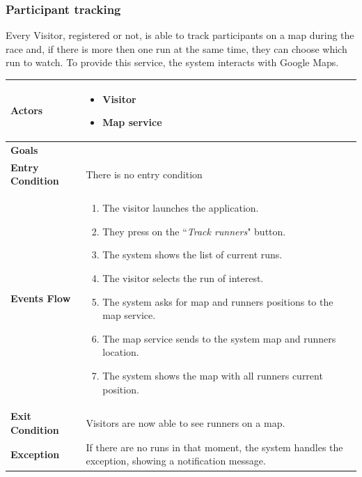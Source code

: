             
        \subsubsection{Participant tracking}
            
            Every Visitor, registered or not, is able to track participants on a map during the race and, if there is more then one run at the same time, they can choose which run to watch. To provide this service, the system interacts with Google Maps.
            
            \begin{table}[H]
            	\centering
                
                \begin{tabular}{|p{3cm}|p{8.2cm}|}
                    \hline
                    \textbf{Actors} & \begin{itemize}
                                            \item Visitor
                                            \item Map service
                                        \end{itemize}\\
                     \hline
                    \textbf{Goals} & \\ 
                     \hline
                    \textbf{Entry Condition} & There is no entry condition \\
                     \hline
                    \textbf{Events Flow} & \begin{enumerate}
                                                \item The visitor launches the application.
                                                \item They press on the ``\emph{Track runners}" button.
                                                \item The system shows the list of current runs.
                                                \item The visitor selects the run of interest.
                                                \item The system asks for map and runners positions to the map service.
                                                \item The map service sends to the system map and runners location.
                                                \item The system shows the map with all runners current position.
                                            \end{enumerate}\\
                     \hline
                    \textbf{Exit Condition} & Visitors are now able to see runners on a map.\\
                     \hline
                    \textbf{Exception} & If there are no runs in that moment, the system handles the exception, showing a notification message.\\
                     \hline
                \end{tabular}  
            \end{table} 
        